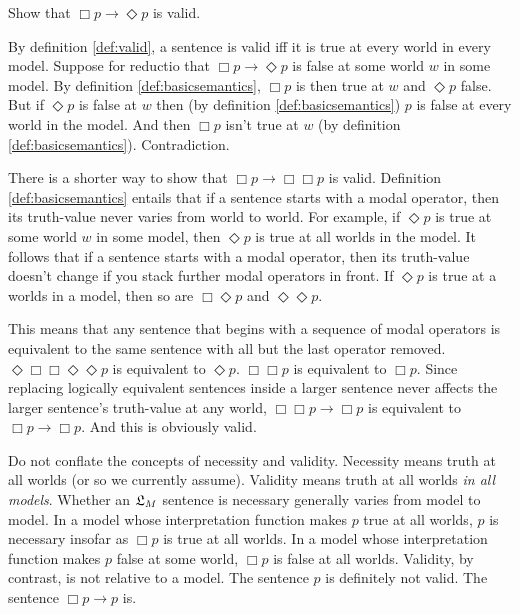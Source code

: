 \begin{exercise}
  Show that $\Box p \to \Diamond p$ is valid. 
\end{exercise}
\begin{solution}
  By definition \ref{def:valid}, a sentence is valid iff it is true at every
  world in every model. Suppose for reductio that $\Box p \to \Diamond p$ is
  false at some world $w$ in some model. By definition \ref{def:basicsemantics},
  $\Box p$ is then true at $w$ and $\Diamond p$ false. But if $\Diamond p$ is
  false at $w$ then (by definition \ref{def:basicsemantics}) $p$ is false at
  every world in the model. And then $\Box p$ isn't true at $w$ (by definition
  \ref{def:basicsemantics}). Contradiction.
\end{solution}

There is a shorter way to show that $\Box p \to \Box\Box p$ is valid. Definition
\ref{def:basicsemantics} entails that if a sentence starts with a modal
operator, then its truth-value never varies from world to world. For example, if
$\Diamond p$ is true at some world $w$ in some model, then $\Diamond p$ is true
at all worlds in the model. It follows that if a sentence starts with a modal
operator, then its truth-value doesn't change if you stack further modal
operators in front. If $\Diamond p$ is true at a worlds in a model, then so
are $\Box\Diamond p$ and $\Diamond \Diamond p$.

This means that any sentence that begins with a sequence of modal operators is
equivalent to the same sentence with all but the last operator removed.
$\Diamond\Box\Box\Diamond\Diamond p$ is equivalent to $\Diamond p$. $\Box\Box p$
is equivalent to $\Box p$. Since replacing logically equivalent sentences inside
a larger sentence never affects the larger sentence's truth-value at any world,
$\Box\Box p \to \Box p$ is equivalent to $\Box p \to \Box p$. And this is
obviously valid.

Do not conflate the concepts of necessity and validity. Necessity means truth at
all worlds (or so we currently assume). Validity means truth at all worlds
\emph{in all models}. Whether an $\mathfrak{L}_M$ sentence is necessary generally varies
from model to model. In a model whose interpretation function makes $p$ true at
all worlds, $p$ is necessary insofar as $\Box p$ is true at all worlds. In a
model whose interpretation function makes $p$ false at some world, $\Box p$ is
false at all worlds. Validity, by contrast, is not relative to a model. The
sentence $p$ is definitely not valid. The sentence $\Box p \to p$ is.

